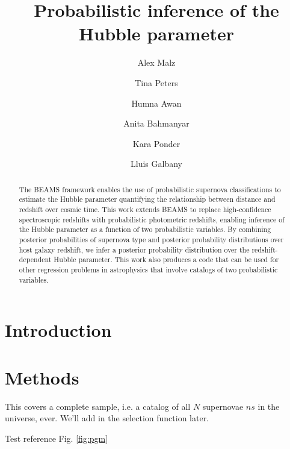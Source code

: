\documentclass[12pt, onecolumn]{emulateapj}
\begin{document}
\title{Probabilistic inference of the Hubble parameter}

\author{Alex Malz}
\author{Tina Peters}
\author{Humna Awan}
\author{Anita Bahmanyar}
\author{Kara Ponder}
\author{Lluis Galbany}

\begin{abstract}
The BEAMS framework enables the use of probabilistic supernova classifications to estimate the Hubble parameter quantifying the relationship between distance and redshift over cosmic time.  This work extends BEAMS to replace high-confidence spectroscopic redshifts with probabilistic photometric redshifts, enabling inference of the Hubble parameter as a function of two probabilistic variables.  By combining posterior probabilities of supernova type and posterior probability distributions over host galaxy redshift, we infer a posterior probability distribution over the redshift-dependent Hubble parameter.  This work also produces a code that can be used for other regression problems in astrophysics that involve catalogs of two probabilistic variables.
\end{abstract}

\keywords{}

\section{Introduction}
\label{sec:intro}

\citet{kunz_bayesian_2007, kelly_flexible_2008}

\section{Methods}
\label{sec:meth}

This covers a complete sample, i.e. a catalog of all $N$ supernovae $ns$ in the universe, ever.  We'll add in the selection function later.

Test reference Fig. \ref{fig:pgm}
\end{document}

